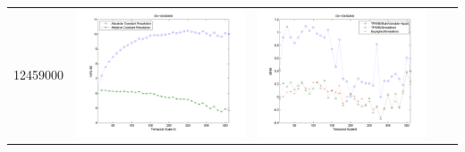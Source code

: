 \documentclass[11pt]{article}
\begin{document}
\begin{table}[H]
{\begin{tabular}{c  c   c   c c }
12459000&\begin{minipage}{.4\textwidth}\includegraphics[width=\linewidth]{resultgraph/12459000e.png}\end{minipage}
&\begin{minipage}{.4\textwidth}\includegraphics[width=\linewidth]{resultgraph/12459000MI.png}\end{minipage}

\end{tabular}}
\end{table}
\end{document}
